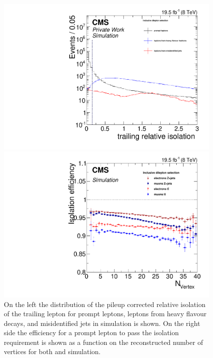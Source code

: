 \begin{figure}[htbp]
\centering
\begin{minipage}[t]{0.49\textwidth}
  \includegraphics[width=\textwidth]{plots/SELECTION/iso_Inclusive_Full2012_TrailingIso_None_MC.pdf}
\end{minipage}
\begin{minipage}[t]{0.49\textwidth}
\includegraphics[width=\textwidth]{plots/SELECTION/isoEff_Inclusive_Full2012_nVtx_None_MC.pdf}
\end{minipage}
\caption{On the left the distribution of the pileup corrected relative isolation of the trailing lepton for prompt leptons, leptons from heavy flavour decays, and misidentified jets in \ttbar simulation is shown. On the right side the efficiency for a prompt lepton to pass the isolation requirement is shown as a function on the reconstructed number of vertices for both \ttbar and \Zjets simulation.}
\label{fig:isolation}
\end{figure}   

